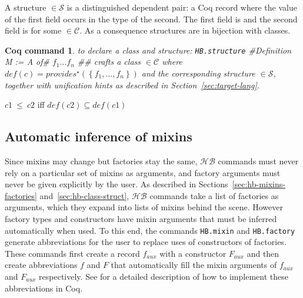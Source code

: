 \documentclass[a4paper,UKenglish,cleveref, autoref]{lipics-v2019}
\newcommand{\HB}{\ensuremath{\mathcal{HB}}}
\newcommand{\mixin}{mixin}
\newcommand{\mixins}{mixins}
\newcommand{\factory}{factory}
\newcommand{\factories}{factories}
\newcommand{\phantterms}{abbreviations}
\newcommand{\C}{\ensuremath{\mathcal{C}}}
\newcommand{\classes}{classes}
\newcommand{\cdef}{\ensuremath{\mathit{def}}}
\newcommand{\Str}{\ensuremath{\mathcal{S}}}
\newcommand{\structure}{structure}
\newcommand{\structures}{structures}
\newcommand{\issubclass}{\ensuremath{\leq}}
\newcommand{\subclass}{subclass}
\newcommand{\provides}{\ensuremath{\mathit{provides}}}
\newcommand{\set}[1]{\left\{#1\right\}}
\newcommand{\enum}[2]{\ensuremath{\set{#1,\ldots,#2}}}
\newcommand{\hbmixin}{{\tt\color{dkgreen}HB.mixin}}
\newcommand{\hbfactory}{{\tt\color{dkgreen}HB.factory}}
\newcommand{\hbstructure}{{\tt\color{dkgreen}HB.structure}}
\theoremstyle{implem}
\theoremstyle{implem}
\theoremstyle{command}
\newtheorem*{command}{Coq command}
\theoremstyle{commands}
\begin{document}
\begin{definition}[\Str{} Structure]
A \structure{}  \(\in \Str{}\) is a distinguished dependent pair: a Coq record where
the value of the first field occurs in the type of the second.
The first field is  and the second field is
 for some  \(\in \C{}\).
As a consequence \structures{} are in bijection with \classes{}.
\end{definition}


\begin{command} to declare a class and structure:
  \hbstructure{} \coq#Definition M := { A of# \(f_1 \ldots f_n\) \coq#}#
  crafts a class  $\in \C{}$ where
  $\cdef{}(c) = \provides{}^\star\left(\enum{f_1}{f_n}\right) $ and the
  corresponding structure  $\in \Str{}$, together with
  unification hints as described in Section~\ref{sec:target-lang}.
\end{command}


\begin{definition}[\issubclass{} \(\in \C{}\times\C{}\), \subclass{}]\label{def:subclass}
  \(c1~\issubclass{}~c2\) iff \(\cdef{}(c2) \subseteq \cdef{}(c1)\)
  \end{definition}

\subsection{Automatic inference of \mixins{}}
\label{sec:autom-infer-mixins}

Since \mixins{} may change but \factories{} stay the same, \HB{}
commands must never rely on a particular set of \mixins{} as
arguments, and \factory{} arguments must never be given explicitly by
the user. As described in Sections~\ref{sec:hb-mixins-factories}
and~\ref{sec:hb-class-struct}, \HB{} commands take a list of
\factories{} as arguments, which they expand into lists of \mixins{}
behind the scene. However \factory{} types and constructors have
\mixin{} arguments that must be inferred automatically when used. To
this end, the commands \hbmixin{} and \hbfactory{} generate
\phantterms{} for the user to replace uses of constructors of \factories{}.
These commands first create a record \(f_{aux}\) with a
constructor \(F_{aux}\) and then create abbreviations \(f\) and \(F\)
that automatically fill the mixin arguments of \(f_{aux}\) and \(F_{aux}\)
respectively.
See \cite[Section 7]{DBLP:conf/itp/MahboubiT13} for a detailed description
of how to implement these abbreviations in Coq.
\end{document}
